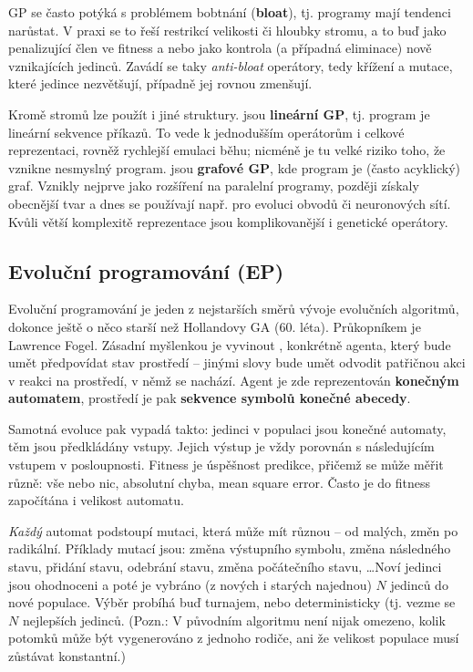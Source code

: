GP se často potýká s problémem bobtnání (\textbf{bloat}), tj. programy mají tendenci narůstat. V praxi se to řeší restrikcí velikosti či hloubky stromu, a to buď jako penalizující člen ve fitness a nebo jako kontrola (a případná eliminace) nově vznikajících jedinců. Zavádí se taky \textit{anti-bloat} operátory, tedy křížení a mutace, které jedince nezvětšují, případně jej rovnou zmenšují.

Kromě stromů lze použít i jiné struktury.  jsou \textbf{lineární GP}, tj. program je lineární sekvence příkazů. To vede k jednodušším operátorům i celkové reprezentaci, rovněž rychlejší emulaci běhu; nicméně je tu velké riziko toho, že vznikne nesmyslný program.  jsou \textbf{grafové GP}, kde program je (často acyklický) graf. Vznikly nejprve jako rozšíření na paralelní programy, později získaly obecnější tvar a dnes se používají např. pro evoluci obvodů či neuronových sítí. Kvůli větší komplexitě reprezentace jsou komplikovanější i genetické operátory.

\subsection{Evoluční programování (EP)}
Evoluční programování je jeden z nejstarších směrů vývoje evolučních algoritmů, dokonce ještě o něco starší než Hollandovy GA (60. léta). Průkopníkem je Lawrence Fogel. Zásadní myšlenkou je vyvinout , konkrétně agenta, který bude umět předpovídat stav prostředí -- jinými slovy bude umět odvodit patřičnou akci v reakci na prostředí, v němž se nachází. Agent je zde reprezentován \textbf{konečným automatem}, prostředí je pak \textbf{sekvence symbolů konečné abecedy}.

Samotná evoluce pak vypadá takto: jedinci v populaci jsou konečné automaty, těm jsou předkládány vstupy. Jejich výstup je vždy porovnán s následujícím vstupem v posloupnosti. Fitness je úspěšnost predikce, přičemž se může měřit různě: vše nebo nic, absolutní chyba, mean square error. Často je do fitness započítána i velikost automatu.

\textit{Každý} automat podstoupí mutaci, která může mít různou  -- od malých,  změn po radikální. Příklady mutací jsou: změna výstupního symbolu, změna následného stavu, přidání stavu, odebrání stavu, změna počátečního stavu, \dots Noví jedinci jsou ohodnoceni a poté je vybráno (z nových i starých najednou) $N$ jedinců do nové populace. Výběr probíhá buď turnajem, nebo deterministicky (tj. vezme se $N$ nejlepších jedinců. (Pozn.: V původním algoritmu není nijak omezeno, kolik potomků může být vygenerováno z jednoho rodiče, ani že velikost populace musí zůstávat konstantní.)

